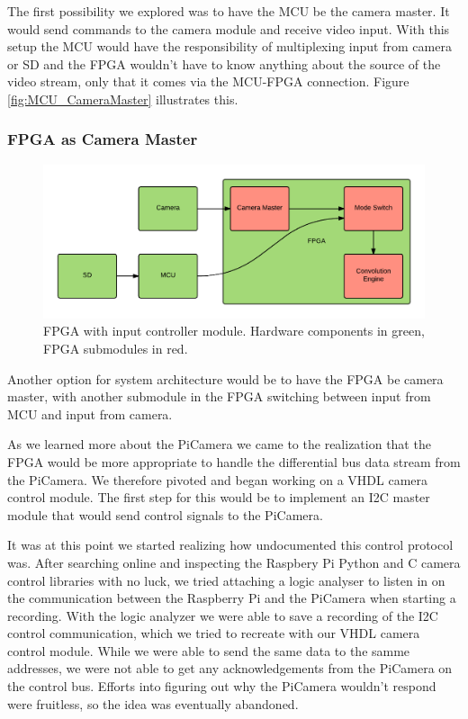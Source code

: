The first possibility we explored was to have the MCU be the camera master.
It would send commands to the camera module and receive video input.
With this setup the MCU would have the responsibility of multiplexing input from camera or SD and the FPGA wouldn't have to know anything about the source of the video stream,
only that it comes via the MCU-FPGA connection.
Figure \ref{fig:MCU_CameraMaster} illustrates this.

\subsubsection{FPGA as Camera Master}
\begin{figure}
    \centering
    \includegraphics[width=\linewidth]{img/FPGA_CameraMaster}
    \caption{FPGA with input controller module. Hardware components in green, FPGA submodules in red.}
    \label{fig:FPGA_CameraMaster}
\end{figure}

Another option for system architecture would be to have the FPGA be camera master,
with another submodule in the FPGA switching between input from MCU and input from camera.

As we learned more about the PiCamera we came to the realization that the FPGA would be more appropriate to handle the differential bus data stream from the PiCamera.
We therefore pivoted and began working on a VHDL camera control module.
The first step for this would be to implement an I2C master module that would send control signals to the PiCamera.

It was at this point we started realizing how undocumented this control protocol was.
After searching online and inspecting the Raspbery Pi Python and C camera control libraries with no luck,
we tried attaching a logic analyser to listen in on the communication between the Raspberry Pi and the PiCamera when starting a recording.
With the logic analyzer we were able to save a recording of the I2C control communication,
which we tried to recreate with our VHDL camera control module.
While we were able to send the same data to the samme addresses,
we were not able to get any acknowledgements from the PiCamera on the control bus.
Efforts into figuring out why the PiCamera wouldn't respond were fruitless, so the idea was eventually abandoned.

